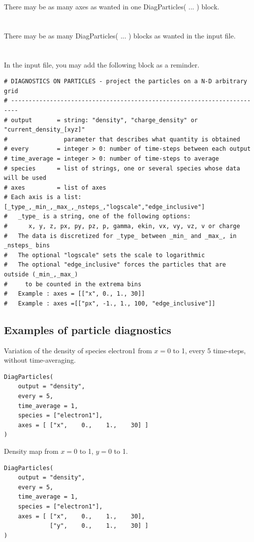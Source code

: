 \documentclass[11pt]{article}
\newcommand{\code}[1]{\colorbox{yellow!15}{\ttfamily #1}}
\begin{document}
There may be as many axes as wanted in one \code{DiagParticles( ... )} block.\\
\\
\\
There may be as many \code{DiagParticles( ... )} blocks as wanted in the input file.\\
\\
\\

In the input file, you may add the following block as a reminder.

\begin{lstlisting}
# DIAGNOSTICS ON PARTICLES - project the particles on a N-D arbitrary grid
# ------------------------------------------------------------------------
# output       = string: "density", "charge_density" or "current_density_[xyz]"
#                parameter that describes what quantity is obtained 
# every        = integer > 0: number of time-steps between each output
# time_average = integer > 0: number of time-steps to average
# species      = list of strings, one or several species whose data will be used
# axes         = list of axes
# Each axis is a list: [_type_,_min_,_max_,_nsteps_,"logscale","edge_inclusive"]
#   _type_ is a string, one of the following options:
#      x, y, z, px, py, pz, p, gamma, ekin, vx, vy, vz, v or charge
#   The data is discretized for _type_ between _min_ and _max_, in _nsteps_ bins
#   The optional "logscale" sets the scale to logarithmic
#   The optional "edge_inclusive" forces the particles that are outside (_min_,_max_)
#     to be counted in the extrema bins
#   Example : axes = [["x", 0., 1., 30]]
#   Example : axes =[["px", -1., 1., 100, "edge_inclusive"]]
\end{lstlisting}


\clearpage
\subsection*{Examples of particle diagnostics}

Variation of the density of species \code{electron1} from $x=0$ to 1, every 5 time-steps, without time-averaging.
\begin{lstlisting}
DiagParticles(
	output = "density",
	every = 5,
	time_average = 1,
	species = ["electron1"],
	axes = [ ["x",    0.,    1.,    30] ]
)
\end{lstlisting}

Density map from $x=0$ to 1, $y=0$ to 1.
\begin{lstlisting}
DiagParticles(
	output = "density",
	every = 5,
	time_average = 1,
	species = ["electron1"],
	axes = [ ["x",    0.,    1.,    30],
	         ["y",    0.,    1.,    30] ]
)
\end{lstlisting}
\end{document}
